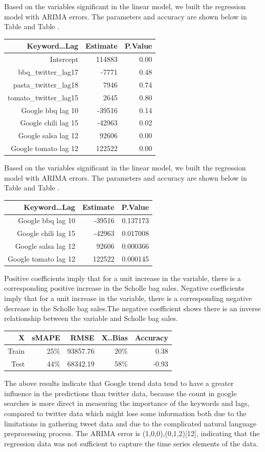 \documentclass[12pt,oneside]{chicagocapstone}
\begin{document}
Based on the variables significant in the linear model, we built the
regression model with ARIMA errors. The parameters and accuracy are
shown below in Table and Table .
\begin{longtable}[]{@{}rrr@{}}
\toprule
Keyword\ldots{}Lag & Estimate & P.Value\tabularnewline
\midrule
\endhead
Intercept & 114883 & 0.00\tabularnewline
bbq\_twitter\_lag17 & -7771 & 0.48\tabularnewline
pasta\_twitter\_lag18 & 7946 & 0.74\tabularnewline
tomato\_twitter\_lag15 & 2645 & 0.80\tabularnewline
Google bbq lag 10 & -39516 & 0.14\tabularnewline
Google chili lag 15 & -42963 & 0.02\tabularnewline
Google salsa lag 12 & 92606 & 0.00\tabularnewline
Google tomato lag 12 & 122522 & 0.00\tabularnewline
\bottomrule
\end{longtable}
Based on the variables significant in the linear model, we built the
regression model with ARIMA errors. The parameters and accuracy are
shown below in Table and Table .
\begin{longtable}[]{@{}rrr@{}}
\toprule
Keyword\ldots{}Lag & Estimate & P.Value\tabularnewline
\midrule
\endhead
Google bbq lag 10 & -39516 & 0.137173\tabularnewline
Google chili lag 15 & -42963 & 0.017008\tabularnewline
Google salsa lag 12 & 92606 & 0.000366\tabularnewline
Google tomato lag 12 & 122522 & 0.000145\tabularnewline
\bottomrule
\end{longtable}
Positive coefficients imply that for a unit increase in the variable,
there is a corresponding positive increase in the Scholle bag sales.
Negative coefficients imply that for a unit increase in the variable,
there is a corresponding negative decrease in the Scholle bag sales.The
negative coefficient shows there is an inverse relationship between the
variable and Scholle bag sales.
\begin{longtable}[]{@{}rrrrr@{}}
\toprule
X & sMAPE & RMSE & X..Bias & Accuracy\tabularnewline
\midrule
\endhead
Train & 25\% & 93857.76 & 20\% & 0.38\tabularnewline
Test & 44\% & 68342.19 & 58\% & -0.93\tabularnewline
\bottomrule
\end{longtable}
The above results indicate that Google trend data tend to have a greater
influence in the predictions than twitter data, because the count in
google searches is more direct in measuring the importance of the
keywords and lags, compared to twitter data which might lose some
information both due to the limitations in gathering tweet data and due
to the complicated natural language preprocessing process. The ARIMA
error is (1,0,0),(0,1,2){[}12{]}, indicating that the regression data
was not sufficient to capture the time series elements of the data.
\end{document}
